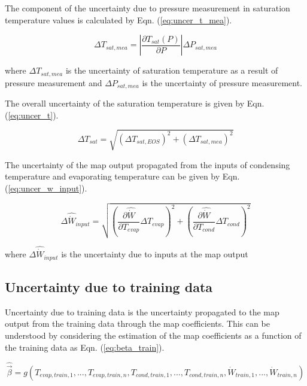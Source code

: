 The component of the uncertainty due to pressure measurement in saturation temperature values is calculated by Eqn. (\ref{eq:uncer_t_mea}).

\begin{equation}
\Delta {T_{sat,mea}} = |\frac{{\partial {T_{sat}}({P})}}{{\partial {P}}}|\Delta {P_{sat,mea}}
\label{eq:uncer_t_mea}
\end{equation}

where $\Delta {T_{sat,mea}}$ is the uncertainty of saturation temperature as a result of pressure measurement and $\Delta P_{sat,mea}$ is the uncertainty of pressure measurement.

The overall uncertainty of the saturation temperature is given by Eqn. (\ref{eq:uncer_t}).

\begin{equation}
\Delta {T_{sat}} = \sqrt {{{(\Delta {T_{sat,EOS}})}^2} + {{(\Delta {T_{sat,mea}})}^2}}
\label{eq:uncer_t}
\end{equation}

The uncertainty of the map output propagated from the inputs of condensing temperature and evaporating temperature can be given by Eqn. (\ref{eq:uncer_w_input}).

\begin{equation}
\Delta {\hat{\dot{W}}_{input}} = \sqrt {{(\frac{{\partial \hat{\dot{W}}}}{{\partial {T_{evap}}}}\Delta {T_{evap}})^2} + {(\frac{{\partial \hat{\dot{W}}}}{{\partial {T_{cond}}}}\Delta {T_{cond}})^2}}
\label{eq:uncer_w_input}
\end{equation}

where $\Delta {\hat{\dot{W}}_{input}}$ is the uncertainty due to inputs at the map output

\subsection{Uncertainty due to training data}
Uncertainty due to training data is the uncertainty propagated to the map output from the training data through the map coefficients. This can be understood by considering the estimation of the map coefficients as a function of the training data as Eqn. (\ref{eq:beta_train}).

\begin{equation}
\hat{ \vec {\beta}}  = g({T_{evap,train,1}},...,{T_{evap,train,n}},{T_{cond,train,1}},...,{T_{cond,train,n}},{\dot{W}_{train,1}},...,{\dot{W}_{train,n}})
\label{eq:beta_train}
\end{equation}

